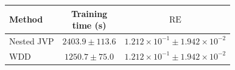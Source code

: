 \begin{tabular}{@{}lcc@{}}
\toprule
Method & \shortstack{Training\\time (s)} & $\operatorname{RE}$ \\
\midrule
Nested JVP & $2403.9 \pm 113.6$ & $1.212\times10^{-1}\pm1.942\times10^{-2}$ \\
WDD & $1250.7 \pm 75.0$ & $1.212\times10^{-1}\pm1.942\times10^{-2}$ \\
\bottomrule
\end{tabular}
